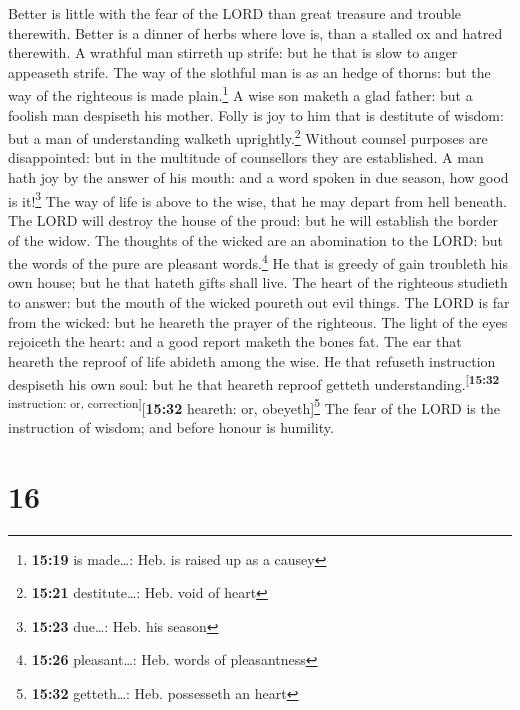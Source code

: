  Better is little with the fear of the LORD than great
treasure and trouble therewith.  Better is a dinner of
herbs where love is, than a stalled ox and hatred therewith.
 A wrathful man stirreth up strife: but he that is slow
to anger appeaseth strife.  The way of the slothful man
is as an hedge of thorns: but the way of the righteous is made
plain.\footnote{\textbf{15:19} is made\ldots: Heb. is raised up as a
  causey}  A wise son maketh a glad father: but a foolish
man despiseth his mother.  Folly is joy to him that is
destitute of wisdom: but a man of understanding walketh
uprightly.\footnote{\textbf{15:21} destitute\ldots: Heb. void of heart}
 Without counsel purposes are disappointed: but in the
multitude of counsellors they are established.  A man
hath joy by the answer of his mouth: and a word spoken in due season,
how good is it!\footnote{\textbf{15:23} due\ldots: Heb. his season}
 The way of life is above to the wise, that he may depart
from hell beneath.  The LORD will destroy the house of
the proud: but he will establish the border of the widow.
 The thoughts of the wicked are an abomination to the
LORD: but the words of the pure are pleasant words.\footnote{\textbf{15:26}
  pleasant\ldots: Heb. words of pleasantness}  He that is
greedy of gain troubleth his own house; but he that hateth gifts shall
live.  The heart of the righteous studieth to answer: but
the mouth of the wicked poureth out evil things.  The
LORD is far from the wicked: but he heareth the prayer of the righteous.
 The light of the eyes rejoiceth the heart: and a good
report maketh the bones fat.  The ear that heareth the
reproof of life abideth among the wise.  He that refuseth
instruction despiseth his own soul: but he that heareth reproof getteth
understanding.\textsuperscript{{[}\textbf{15:32} instruction: or,
correction{]}}{[}\textbf{15:32} heareth: or, obeyeth{]}\footnote{\textbf{15:32}
  getteth\ldots: Heb. possesseth an heart}  The fear of
the LORD is the instruction of wisdom; and before honour is humility.

\hypertarget{section-15}{%
\section{16}\label{section-15}}

